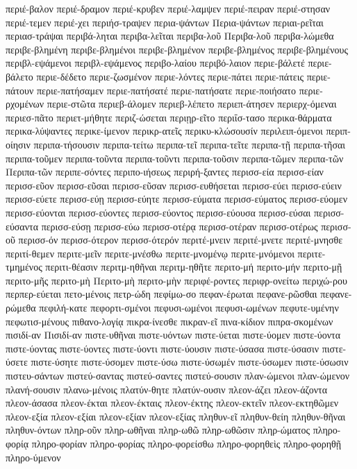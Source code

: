 {περιέ-βαλον
περιέ-δραμον
περιέ-κρυβεν
περιέ-λαμψεν
περιέ-πειραν
περιέ-στησαν
περιέ-τεμεν
περιέ-χει
περιήσ-τραψεν
περια-ψάντων
Περια-ψάντων
περιαι-ρεῖται
περιασ-τράψαι
περιβά-ληται
περιβα-λεῖται
περιβα-λοῦ
Περιβα-λοῦ
περιβα-λώμεθα
περιβε-βλημένη
περιβε-βλημένοι
περιβε-βλημένον
περιβε-βλημένος
περιβε-βλημένους
περιβλ-εψάμενοι
περιβλ-εψάμενος
περιβο-λαίου
περιβό-λαιον
περιε-βάλετέ
περιε-βάλετο
περιε-δέδετο
περιε-ζωσμένον
περιε-λόντες
περιε-πάτει
περιε-πάτεις
περιε-πάτουν
περιε-πατήσαμεν
περιε-πατήσατέ
περιε-πατήσατε
περιε-ποιήσατο
περιε-ρχομένων
περιε-στῶτα
περιεβ-άλομεν
περιεβ-λέπετο
περιεπ-άτησεν
περιερχ-όμεναι
περιεσ-πᾶτο
περιετ-μήθητε
περιζ-ώσεται
περιῃρ-εῖτο
περιΐσ-τασο
περικα-θάρματα
περικα-λύψαντες
περικε-ίμενον
περικρ-ατεῖς
περικυ-κλώσουσίν
περιλειπ-όμενοι
περιπ-οίησιν
περιπα-τήσουσιν
περιπα-τείτω
περιπα-τεῖ
περιπα-τεῖτε
περιπα-τῇ
περιπα-τῆσαι
περιπα-τοῦμεν
περιπα-τοῦντα
περιπα-τοῦντι
περιπα-τοῦσιν
περιπα-τῶμεν
περιπα-τῶν
Περιπα-τῶν
περιπε-σόντες
περιπο-ιήσεως
περιρή-ξαντες
περισσ-εία
περισσ-είαν
περισσ-εῦον
περισσ-εῦσαι
περισσ-εῦσαν
περισσ-ευθήσεται
περισσ-εύει
περισσ-εύειν
περισσ-εύετε
περισσ-εύῃ
περισσ-εύητε
περισσ-εύματα
περισσ-εύματος
περισσ-εύομεν
περισσ-εύονται
περισσ-εύοντες
περισσ-εύοντος
περισσ-εύουσα
περισσ-εύσαι
περισσ-εύσαντα
περισσ-εύσῃ
περισσ-εύω
περισσ-οτέρᾳ
περισσ-οτέραν
περισσ-οτέρως
περισσ-οῦ
περισσ-όν
περισσ-ότερον
περισσ-ότερόν
περιτέ-μνειν
περιτέ-μνετε
περιτέ-μνησθε
περιτί-θεμεν
περιτε-μεῖν
περιτε-μνέσθω
περιτε-μνομένῳ
περιτε-μνόμενοι
περιτε-τμημένος
περιτι-θέασιν
περιτμ-ηθῆναι
περιτμ-ηθῆτε
περιτο-μή
περιτο-μήν
περιτο-μῇ
περιτο-μῆς
περιτο-μὴ
Περιτο-μὴ
περιτο-μὴν
περιφέ-ροντες
περιφρ-ονείτω
περιχώ-ρου
περπερ-εύεται
πετο-μένοις
πετρ-ώδη
πεφίμω-σο
πεφαν-έρωται
πεφανε-ρῶσθαι
πεφανε-ρώμεθα
πεφιλή-κατε
πεφορτι-σμένοι
πεφυσι-ωμένοι
πεφυσι-ωμένων
πεφυτε-υμένην
πεφωτισ-μένους
πιθανο-λογίᾳ
πικρα-ίνεσθε
πικραν-εῖ
πινα-κίδιον
πιπρα-σκομένων
πισιδί-αν
Πισιδί-αν
πιστε-υθῆναι
πιστε-υόντων
πιστε-ύεται
πιστε-ύομεν
πιστε-ύοντα
πιστε-ύοντας
πιστε-ύοντες
πιστε-ύοντι
πιστε-ύουσιν
πιστε-ύσασα
πιστε-ύσασιν
πιστε-ύσετε
πιστε-ύσητε
πιστε-ύσομεν
πιστε-ύσω
πιστε-ύσωμέν
πιστε-ύσωμεν
πιστε-ύσωσιν
πιστευ-σάντων
πιστεύ-σαντας
πιστεύ-σαντες
πιστεύ-σουσιν
πλαν-ώμενοι
πλαν-ώμενον
πλανή-σουσιν
πλανω-μένοις
πλατύν-θητε
πλατύν-ουσιν
πλεον-άζει
πλεον-άζοντα
πλεον-άσασα
πλεον-έκται
πλεον-έκταις
πλεον-έκτης
πλεον-εκτεῖν
πλεον-εκτηθῶμεν
πλεον-εξία
πλεον-εξίαι
πλεον-εξίαν
πλεον-εξίας
πληθυν-εῖ
πληθυν-θείη
πληθυν-θῆναι
πληθυν-όντων
πληρ-οῦν
πληρ-ωθῆναι
πληρ-ωθῶ
πληρ-ωθῶσιν
πληρ-ώματος
πληρο-φορίᾳ
πληρο-φορίαν
πληρο-φορίας
πληρο-φορείσθω
πληρο-φορηθεὶς
πληρο-φορηθῇ
πληρο-ύμενον
}
